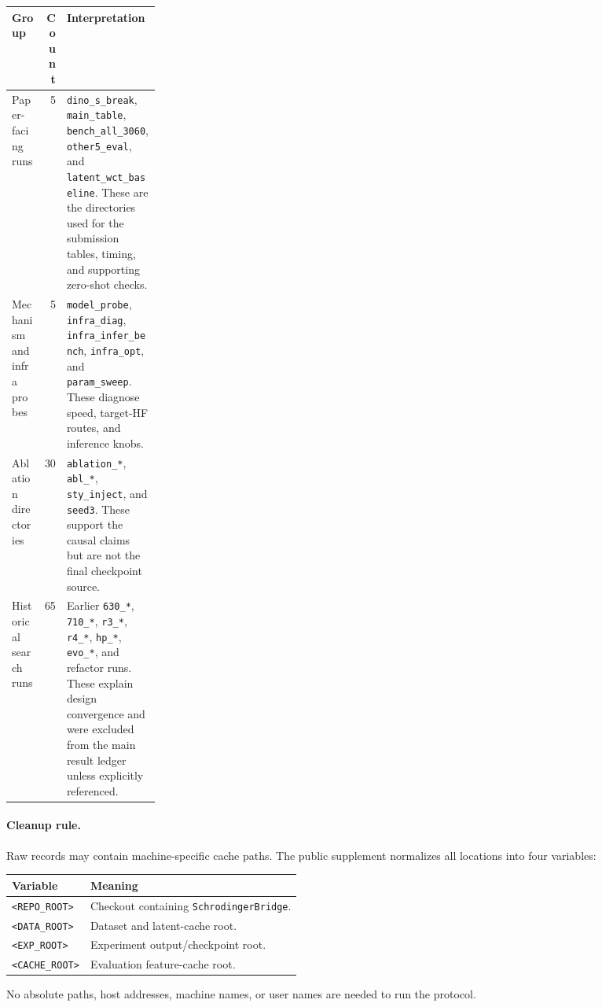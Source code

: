 \documentclass[10pt,twocolumn]{article}
\begin{document}
\begin{center}
\begin{tabularx}{\linewidth}{p{0.22\linewidth}rX}
\toprule
Group & Count & Interpretation \\
\midrule
Paper-facing runs & 5 & \texttt{dino\_s\_break}, \texttt{main\_table}, \texttt{bench\_all\_3060}, \texttt{other5\_eval}, and \texttt{latent\_wct\_baseline}. These are the directories used for the submission tables, timing, and supporting zero-shot checks. \\
Mechanism and infra probes & 5 & \texttt{model\_probe}, \texttt{infra\_diag}, \texttt{infra\_infer\_bench}, \texttt{infra\_opt}, and \texttt{param\_sweep}. These diagnose speed, target-HF routes, and inference knobs. \\
Ablation directories & 30 & \texttt{ablation\_*}, \texttt{abl\_*}, \texttt{sty\_inject}, and \texttt{seed3}. These support the causal claims but are not the final checkpoint source. \\
Historical search runs & 65 & Earlier \texttt{630\_*}, \texttt{710\_*}, \texttt{r3\_*}, \texttt{r4\_*}, \texttt{hp\_*}, \texttt{evo\_*}, and refactor runs. These explain design convergence and were excluded from the main result ledger unless explicitly referenced. \\
\bottomrule
\end{tabularx}
\end{center}

\paragraph{Cleanup rule.}
Raw records may contain machine-specific cache paths. The public supplement normalizes
all locations into four variables:
\begin{center}
\begin{tabular}{ll}
\toprule
Variable & Meaning \\
\midrule
\texttt{<REPO\_ROOT>} & Checkout containing \texttt{SchrodingerBridge}. \\
\texttt{<DATA\_ROOT>} & Dataset and latent-cache root. \\
\texttt{<EXP\_ROOT>} & Experiment output/checkpoint root. \\
\texttt{<CACHE\_ROOT>} & Evaluation feature-cache root. \\
\bottomrule
\end{tabular}
\end{center}
No absolute paths, host addresses, machine names, or user names are needed to
run the protocol.
\end{document}
